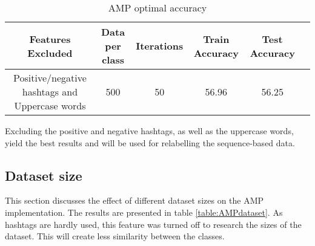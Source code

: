 \begin{table}[h!]
\begin{center}
\begin{tabular}{| c | c | c | c | c | c |}
\hline
 {\textbf{Features Excluded}} 	 
 & {\textbf{Data per class}} 					& {\textbf{Iterations}} 
 & {\textbf{Train Accuracy}} 					& {\textbf{Test Accuracy}} 
 \\
\hline
\parbox[t]{3cm}{Positive/negative hashtags and Uppercase words}	&	500	&	50	&	56.96	& 	56.25	\\
\hline
\end{tabular}
\caption{AMP optimal accuracy}
\label{table:AMPoptimal}
\end{center}
\end{table}

Excluding the positive and negative hashtags, as well as the uppercase words, yield the best results and will be used for relabelling the sequence-based data.

\begin{comment}
Tests show that some of the features are not meaningful enough and including them in the set of used features only decreases the performance. Furthermore, the Average Multiclass Perceptron was also used further in this project in a scenario where the data does not contain any hashtags. Thus, in table \ref{table:AMPfeatures}, results are shown for two different feature sets. The first one, denoted as `all', contains all features discussed in section \ref{sec:features}.
The second one, denoted in table \ref{table:AMPaccuracy} as `subset', is a subset of all features, which does not contain hashtag-related features \red{and maybe the uppercase words since ubuntu data does not contain much of them? shall we try also without it}.
\end{comment}

\subsection{Dataset size}
This section discusses the effect of different dataset sizes on the AMP implementation. The results are presented in table \ref{table:AMPdataset}. As hashtags are hardly used, this feature was turned off to research the sizes of the dataset. This will create less similarity between the classes.

